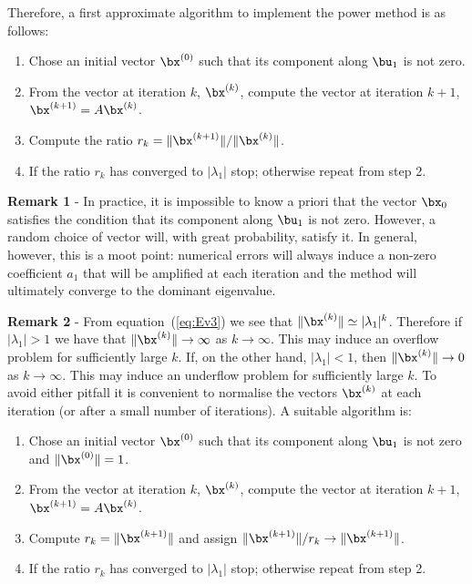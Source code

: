 \noindent
Therefore, a first approximate algorithm to implement the power method
is as follows:

\begin{enumerate}
\item Chose an initial vector $\bx^{(0)}$ such that its component
  along $\bu_1$ is not zero.
\item From the vector at iteration $k$, $\bx^{(k)}$, compute the
  vector at iteration $k+1$, $\bx^{(k+1)} = A \bx^{(k)}$.
\item Compute the ratio $r_k = \| \bx^{(k+1)}\|/\| \bx^{(k)} \|$.
\item If the ratio $r_k$ has converged to $| \lambda_1|$ stop;
  otherwise repeat from step 2.
\end{enumerate}

\noindent 
\textbf{Remark 1} - In practice, it is impossible to know a priori
that the vector $\bx_0$ satisfies the condition that its component
along $\bu_1$ is not zero.  However, a random choice of vector will,
with great probability, satisfy it.  In general, however, this is a
moot point: numerical errors will always induce a non-zero coefficient
$a_1$ that will be amplified at each iteration and the method will
ultimately converge to the dominant eigenvalue.

\smallskip

\noindent
\textbf{Remark 2} - From equation~(\ref{eq:Ev3}) we see that $\|
\bx^{(k)} \| \simeq | \lambda_1|^k$.  Therefore if $| \lambda_1 | > 1$
we have that $\| \bx^{(k)} \| \to \infty$ as $k \to \infty$.  This may
induce an overflow problem for sufficiently large $k$.  If, on the
other hand, $| \lambda_1 | < 1$, then $\| \bx^{(k)} \| \to 0$ as $k
\to \infty$.  This may induce an underflow problem for sufficiently
large $k$.  To avoid either pitfall it is convenient to normalise the
vectors $\bx^{(k)}$ at each iteration (or after a small number of
iterations).  A suitable algorithm is:

\begin{enumerate}
\item Chose an initial vector $\bx^{(0)}$ such that its
  component along $\bu_1$ is not zero and $\| \bx^{(0)} \| = 1$.
\item From the vector at iteration $k$, $\bx^{(k)}$, compute the
  vector at iteration $k+1$, $\bx^{(k+1)} = A \bx^{(k)}$.
\item Compute  $r_k = \| \bx^{(k+1)}\|$ and assign $\|
  \bx^{(k+1)}\|/r_k \to \| \bx^{(k+1)}\|$.
\item If the ratio $r_k$ has converged to $|\lambda_1|$ stop;
  otherwise repeat from step 2.
\end{enumerate}

